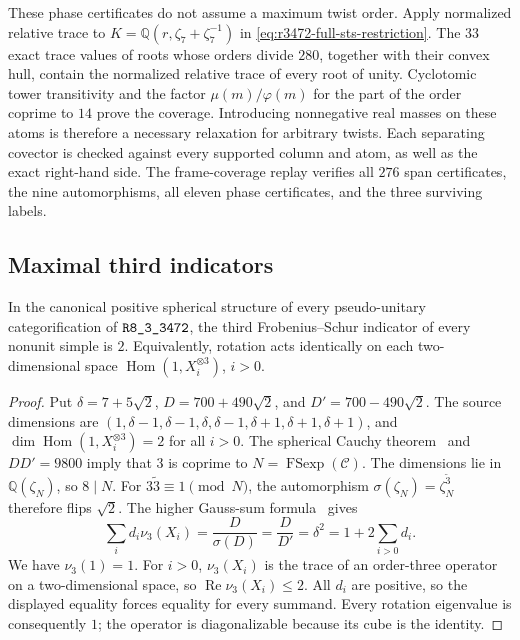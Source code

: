 These phase certificates do not assume a maximum twist order. Apply
normalized relative trace to
$K=\mathbb Q(r,\zeta_7+\zeta_7^{-1})$ in
\eqref{eq:r3472-full-sts-restriction}. The $33$ exact trace values of
roots whose orders divide $280$, together with their convex hull, contain
the normalized relative trace of every root of unity. Cyclotomic tower
transitivity and the factor $\mu(m)/\varphi(m)$ for the part of the
order coprime to $14$ prove the coverage. Introducing nonnegative real
masses on these atoms is therefore a necessary relaxation for arbitrary
twists. Each separating covector is checked against every supported
column and atom, as well as the exact right-hand side. The frame-coverage
replay verifies all $276$ span certificates, the nine automorphisms,
all eleven phase certificates, and the three surviving labels.

\subsection{Maximal third indicators}
\begin{proposition}\label{prop:r3472-maximal-third-indicator}
In the canonical positive spherical structure of every pseudo-unitary
categorification of $\sha{R8_3_3472}$,
the third Frobenius--Schur indicator of every nonunit simple is $2$.
Equivalently, rotation acts identically on each two-dimensional space
$\operatorname{Hom}(1,X_i^{\otimes3})$, $i>0$.
\end{proposition}
\begin{proof}
Put $\delta=7+5\sqrt2$, $D=700+490\sqrt2$, and $D'=700-490\sqrt2$.
The source dimensions are
$(1,\delta-1,\delta-1,\delta,\delta-1,\delta+1,\delta+1,\delta+1)$,
and $\dim\operatorname{Hom}(1,X_i^{\otimes3})=2$ for all $i>0$.
The spherical Cauchy theorem~\cite[Theorem~3.9]{BNRWCauchy} and
$DD'=9800$ imply that $3$ is coprime to
$N=\operatorname{FSexp}(\mathcal C)$.
The dimensions lie in $\mathbb Q(\zeta_N)$, so $8\mid N$.
For $3\widetilde3\equiv1\pmod N$, the automorphism
$\sigma(\zeta_N)=\zeta_N^{\widetilde3}$ therefore flips $\sqrt2$.
The higher Gauss-sum formula~\cite[Theorem~4.4, (4.17)]{NSWHigherGauss}
gives
\[
 \sum_i d_i\nu_3(X_i)=\frac D{\sigma(D)}
 =\frac D{D'}=\delta^2=1+2\sum_{i>0}d_i.
\]
We have $\nu_3(1)=1$. For $i>0$, $\nu_3(X_i)$ is the trace of an
order-three operator on a two-dimensional space, so
$\operatorname{Re}\nu_3(X_i)\le2$.
All $d_i$ are positive, so the displayed equality forces equality
for every summand. Every rotation eigenvalue is consequently $1$;
the operator is diagonalizable because its cube is the identity.
\end{proof}

